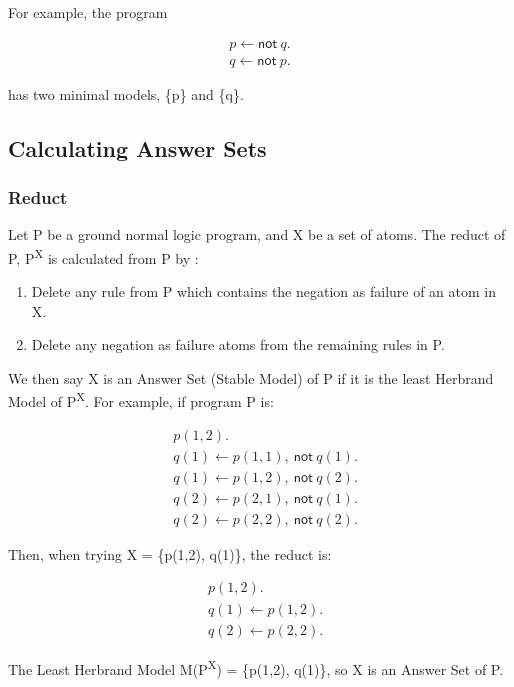 For example, the program 

\begin{align*}
p \gets \textsf{not} \: q. \\
q \gets \textsf{not} \: p. 
\end{align*}

has two minimal models, \{p\} and \{q\}.

\subsection{Calculating Answer Sets}

\subsubsection{Reduct}

Let P be a ground normal logic program, and X be a set of atoms. The reduct of P, P\textsuperscript{X} is calculated from P by :

\begin{enumerate}
\item Delete any rule from P which contains the negation as failure of an atom in X.
\item Delete any negation as failure atoms from the remaining rules in P.
\end{enumerate}

We then say X is an Answer Set (Stable Model) of P if it is the least Herbrand Model of  P\textsuperscript{X}. For example, if program P is:

\begin{align*}
&p(1,2). \\
&q(1) \gets p(1, 1), \: \textsf{not} \: q(1). \\
&q(1) \gets p(1, 2), \: \textsf{not} \: q(2). \\
&q(2) \gets p(2, 1), \: \textsf{not} \: q(1). \\
&q(2) \gets p(2, 2), \: \textsf{not} \: q(2).
\end{align*}

Then, when trying X = \{p(1,2), q(1)\}, the reduct is:

\begin{align*}
&p(1,2). \\
&q(1) \gets p(1, 2). \\
&q(2) \gets p(2, 2).
\end{align*}

The Least Herbrand Model M(P\textsuperscript{X}) = \{p(1,2), q(1)\}, so X is an Answer Set of P. \\ \\

